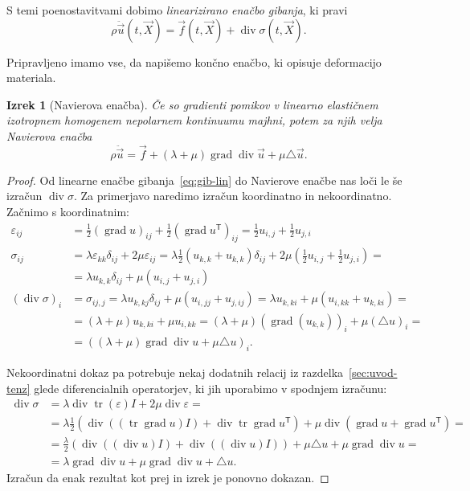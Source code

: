 \documentclass[12pt,a4paper,twoside]{article}
\theoremstyle{definition} %
\theoremstyle{plain} %
\newtheorem{izrek}[definicija]{Izrek}
\numberwithin{equation}{section}
\newcommand{\T}{\mathsf{T}}
\newcommand{\lap}{\triangle}
\renewcommand{\div}{\operatorname{div}}
\newcommand{\grad}{\operatorname{grad}}
\newcommand{\eps}{\varepsilon}
\newcommand{\vu}{\vec{u}}
\newcommand{\vf}{\vec{f}}
\newcommand{\vX}{\vec{X}}
\newcommand{\ts}{\sigma}
\DeclareMathOperator{\tr}{tr}
\begin{document}
S temi poenostavitvami dobimo \emph{linearizirano enačbo gibanja}, ki pravi
\begin{equation}
  \rho \ddot{\vu}(t, \vX) = \vf(t, \vX) + \div\sigma(t, \vX).
  \label{eq:gib-lin}
\end{equation}

Pripravljeno imamo vse, da napišemo končno enačbo, ki opisuje deformacijo materiala.
\begin{izrek}[Navierova enačba]
  Če so gradienti pomikov v linearno elastičnem izotropnem homogenem nepolarnem kontinuumu majhni,
  potem za njih velja \emph{Navierova enačba}
  \begin{equation}
    \rho \ddot{\vu} = \vf + (\lambda + \mu)\grad\div \vu + \mu \lap \vu.
    \label{eq:navier}
  \end{equation}
\end{izrek}
\begin{proof}
Od linearne enačbe gibanja~\eqref{eq:gib-lin} do Navierove enačbe nas loči le še
izračun $\div \sigma$. Za primerjavo naredimo izračun koordinatno in
nekoordinatno. Začnimo s koordinatnim:
\begin{align*}
  \eps_{ij} &= \frac12 (\grad u)_{ij} + \frac12 (\grad u^\T)_{ij} =
  \frac12 u_{i,j} + \frac12 u_{j,i} \\
  \ts_{ij} &= \lambda \eps_{kk} \delta_{ij} + 2 \mu \eps_{ij} =
  \lambda \frac{1}{2} (u_{k,k} + u_{k,k}) \delta_{ij} + 2 \mu( \frac12 u_{i,j} +
  \frac12 u_{j,i}) =  \\ &= \lambda u_{k, k}\delta_{ij} + \mu (u_{i,j} +u_{j,i})
  \\
  (\div \ts)_i &= \sigma_{ij,j} = \lambda u_{k, kj}\delta_{ij} + \mu (u_{i,jj}
+u_{j,ij}) = \lambda u_{k,ki} + \mu (u_{i,kk} + u_{k,ki}) = \\
&= (\lambda + \mu)u_{k,ki} + \mu u_{i,kk} = (\lambda+\mu)(\grad(u_{k,k}))_i +
\mu (\lap u)_i = \\ &=
((\lambda + \mu)\grad\div u + \mu \lap u)_i.
\end{align*}

Nekoordinatni dokaz pa potrebuje nekaj dodatnih relacij iz razdelka~\ref{sec:uvod-tenz} glede
diferencialnih operatorjev, ki jih uporabimo v spodnjem izračunu:
\begin{align*}
  \div\ts &= \lambda \div \tr(\eps) I + 2\mu \div \eps = \\ &=
  \lambda \frac12(\div((\tr\grad u)I) + \div\tr\grad u^\T) + \mu \div(\grad u + \grad
  u^\T) = \\
  &= \frac{\lambda}{2} (\div((\div u) I) + \div( (\div u)I)) + \mu \lap u + \mu
  \grad \div u = \\
  &= \lambda \grad \div u + \mu \grad \div u + \lap u.
\end{align*}
Izračun da enak rezultat kot prej in izrek je ponovno dokazan.
\end{proof}
\end{document}
